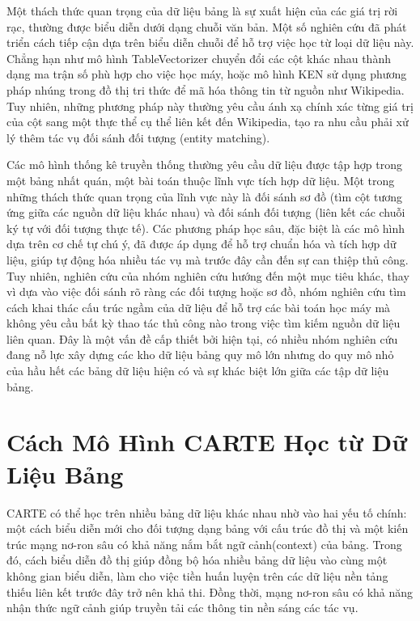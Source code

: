 \documentclass{article}
\begin{document}
Một thách thức quan trọng của dữ liệu bảng là sự xuất hiện của các giá trị rời rạc, thường được biểu diễn dưới dạng chuỗi văn bản. Một số nghiên cứu đã phát triển cách tiếp cận dựa trên biểu diễn chuỗi để hỗ trợ việc học từ loại dữ liệu này. Chẳng hạn như mô hình TableVectorizer chuyển đổi các cột khác nhau thành dạng ma trận số phù hợp cho việc học máy, hoặc mô hình KEN sử dụng phương pháp nhúng trong đồ thị tri thức để mã hóa thông tin từ nguồn như Wikipedia. Tuy nhiên, những phương pháp này thường yêu cầu ánh xạ chính xác từng giá trị của cột sang một thực thể cụ thể liên kết đến Wikipedia, tạo ra nhu cầu phải xử lý thêm tác vụ đối sánh đối tượng (entity matching). 

Các mô hình thống kê truyền thống thường yêu cầu dữ liệu được tập hợp trong một bảng nhất quán, một bài toán thuộc lĩnh vực tích hợp dữ liệu. Một trong những thách thức quan trọng của lĩnh vực này là đối sánh sơ đồ (tìm cột tương ứng giữa các nguồn dữ liệu khác nhau) và đối sánh đối tượng (liên kết các chuỗi ký tự với đối tượng thực tế). Các phương pháp học sâu, đặc biệt là các mô hình dựa trên cơ chế tự chú ý, đã được áp dụng để hỗ trợ chuẩn hóa và tích hợp dữ liệu, giúp tự động hóa nhiều tác vụ mà trước đây cần đến sự can thiệp thủ công. Tuy nhiên, nghiên cứu của nhóm nghiên cứu hướng đến một mục tiêu khác, thay vì dựa vào việc đối sánh rõ ràng các đối tượng hoặc sơ đồ, nhóm nghiên cứu tìm cách khai thác cấu trúc ngầm của dữ liệu để hỗ trợ các bài toán học máy mà không yêu cầu bất kỳ thao tác thủ công nào trong việc tìm kiếm nguồn dữ liệu liên quan. Đây là một vấn đề cấp thiết bởi hiện tại, có nhiều nhóm nghiên cứu đang nỗ lực xây dựng các kho dữ liệu bảng quy mô lớn nhưng do quy mô nhỏ của hầu hết các bảng dữ liệu hiện có và sự khác biệt lớn giữa các tập dữ liệu bảng. 

\section{Cách Mô Hình CARTE Học từ Dữ Liệu Bảng}
CARTE có thể học trên nhiều bảng dữ liệu khác nhau nhờ vào hai yếu tố chính: một cách biểu diễn mới cho đối tượng dạng bảng với cấu trúc đồ thị và một kiến trúc mạng nơ-ron sâu có khả năng nắm bắt ngữ cảnh(context) của bảng. Trong đó, cách biểu diễn đồ thị giúp đồng bộ hóa nhiều bảng dữ liệu vào cùng một không gian biểu diễn, làm cho việc tiền huấn luyện trên các dữ liệu nền tảng thiếu liên kết trước đây trở nên khả thi. Đồng thời, mạng nơ-ron sâu có khả năng nhận thức ngữ cảnh giúp truyền tải các thông tin nền sáng các tác vụ. 
\end{document}
